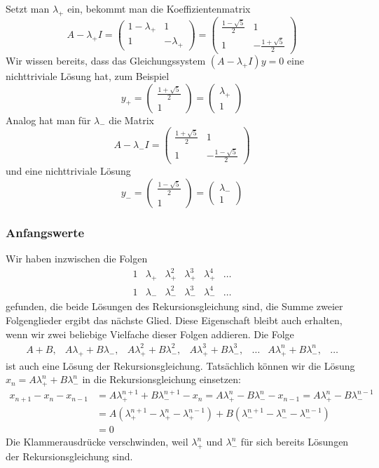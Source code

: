 Setzt man $\lambda_+$ ein, bekommt man die Koeffizientenmatrix
\[
A-\lambda_+I=
\begin{pmatrix}
1-\lambda_+&1\\1&-\lambda_+
\end{pmatrix}
=
\begin{pmatrix}
\frac{1-\sqrt{5}}2&1\\1&-\frac{1+\sqrt{5}}2
\end{pmatrix}
\]
Wir wissen bereits, dass das Gleichungssystem $(A-\lambda_+I)y=0$
eine nichttriviale Lösung hat, zum Beispiel
\[
y_+=\begin{pmatrix}
\frac{1+\sqrt{5}}2\\1
\end{pmatrix}
=\begin{pmatrix}
\lambda_+\\1
\end{pmatrix}
\]
Analog hat man für $\lambda_-$ die Matrix
\[
A-\lambda_-I=
\begin{pmatrix}
\frac{1+\sqrt{5}}2&1\\
1&-\frac{1-\sqrt{5}}2
\end{pmatrix}
\]
und eine nichttriviale Lösung 
\[
y_-=\begin{pmatrix}
\frac{1-\sqrt{5}}2\\
1
\end{pmatrix}=
\begin{pmatrix}
\lambda_-\\1
\end{pmatrix}
\]
\subsubsection{Anfangswerte}
Wir haben inzwischen die Folgen
\[
\begin{matrix}
1&\lambda_+&\lambda_+^2&\lambda_+^3&\lambda_+^4&\dots\\
1&\lambda_-&\lambda_-^2&\lambda_-^3&\lambda_-^4&\dots
\end{matrix}
\]
gefunden, die beide Lösungen des Rekursionsgleichung sind, die Summe
zweier Folgenglieder ergibt das nächste Glied.
Diese Eigenschaft bleibt auch erhalten, wenn wir zwei beliebige
Vielfache dieser Folgen addieren.
Die Folge
\[
\begin{matrix}
A+B,
&A\lambda_++B\lambda_-,
&A\lambda_+^2+B\lambda_-^2,
&A\lambda_+^3+B\lambda_-^3,
&\dots
&A\lambda_+^n+B\lambda_-^n,
&\dots
\end{matrix}
\]
ist auch eine Lösung der Rekursionsgleichung.
Tatsächlich können
wir die Lösung
$x_n=A\lambda_+^n + B\lambda_-^n$
in die Rekursionsgleichung einsetzen:
\begin{align*}
x_{n+1}-x_n-x_{n-1}
&=A\lambda_+^{n+1} + B\lambda_-^{n+1}
-x_n=A\lambda_+^n - B\lambda_-^n
-x_{n-1}=A\lambda_+^n - B\lambda_-^{n-1}
\\
&=
A(\lambda_+^{n+1}-\lambda_+^n-\lambda_+^{n-1})
+
B(\lambda_-^{n+1}-\lambda_-^n-\lambda_-^{n-1})
\\
&=0
\end{align*}
Die Klammerausdrücke verschwinden, weil $\lambda_+^n$ und $\lambda_-^n$
für sich bereits Lösungen der Rekursionsgleichung sind.

